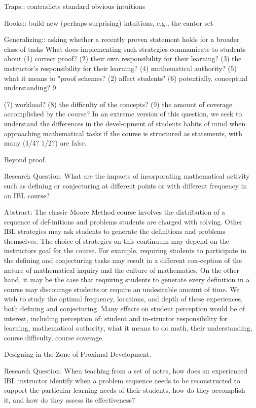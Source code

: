 \documentclass[11pt]{article}
\begin{document}
Traps:: contradicts standard obvious intuitions

Hooks:: build new (perhaps surprising) intuitions, e.g., the cantor set

Generalizing:: asking whether a recently proven statement holds for a broader class of tasks What does implementing such strategies communicate to students about (1) correct proof? (2) their own responsibility for their learning? (3) the instructor's responsibility for their learning? (4) mathematical authority? (5) what it means to "proof schemes? (2) affect students" (6) potentially, conceptual understanding? 9

(7) workload? (8) the difficulty of the concepts? (9) the amount of coverage accomplished by the course? In an extreme version of this question, we seek to understand the differences in the devel-opment of students habits of mind when approaching mathematical tasks if the course is structured as statements, with many (1/4? 1/2?) are false.

Beyond proof.

Research Question: What are the impacts of incorporating mathematical activity such as defining or conjecturing at different points or with different frequency in an IBL course?

Abstract: The classic Moore Method course involves the distribution of a sequence of def-initions and problems students are charged with solving. Other IBL strategies may ask students to generate the definitions and problems themselves. The choice of strategies on this continuum may depend on the instructors goal for the course. For example, requiring students to participate in the defining and conjecturing tasks may result in a different con-ception of the nature of mathematical inquiry and the culture of mathematics. On the other hand, it may be the case that requiring students to generate every definition in a course may discourage students or require an undesirable amount of time. We wish to study the optimal frequency, locations, and depth of these experiences, both defining and conjecturing. Many effects on student perception would be of interest, including perception of: student and in-structor responsibility for learning, mathematical authority, what it means to do math, their understanding, course difficulty, course coverage.

Designing in the Zone of Proximal Development.

Research Question: When teaching from a set of notes, how does an experienced IBL instructor identify when a problem sequence needs to be reconstructed to support the particular learning needs of their students, how do they accomplish it, and how do they assess its effectiveness?
\end{document}
